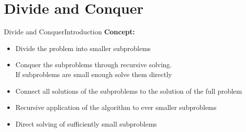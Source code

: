 \section{Divide and Conquer}
\label{chap:divide_and_conquer}


\begin{frame}{Divide and Conquer}{Introduction}
  \textbf{Concept:}
  \begin{itemize}
    \item<2->
      {\color{MainA}Divide} the problem into smaller subproblems
    \item<3->
      {\color{MainA}Conquer} the subproblems through recursive solving.\\
      If subproblems are small enough solve them directly
    \item<4->
      {\color{MainA}Connect} all solutions of the subproblems to the solution of the
      full problem
    \item<5->
      {\color{MainA}Recursive} application of the algorithm to ever smaller
      subproblems
    \item<6->
      {\color{MainA}Direct} solving of sufficiently small subproblems
  \end{itemize}
\end{frame}





